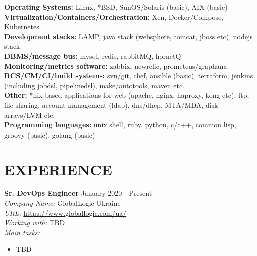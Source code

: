 \documentclass[mymargin,10pt]{res} %
\begin{document}
\begin{resume}
{\bf Operating Systems:} Linux, *BSD, SunOS/Solaris (basic), AIX (basic) \\
{\bf Virtualization/Containers/Orchestration:} Xen, Docker/Compose, Kubernetes \\
{\bf Development stacks:} LAMP, java stack (websphere, tomcat, jboss etc), nodejs stack \\
{\bf DBMS/message bus:} mysql, redis, rabbitMQ, hornetQ \\
{\bf Monitoring/metrics software:}  zabbix, newrelic, prometeus/graphana \\
{\bf RCS/CM/CI/build systems:} svn/git, chef, ansible (basic), terraform, jenkins (including jobdsl, pipelinedsl), make/autotools, maven etc. \\
{\bf Other:} *nix-based applications for web (apache, nginx, haproxy, kong etc), ftp, file sharing, account management (ldap), dns/dhcp, MTA/MDA, disk arrays/LVM etc. \\
{\bf Programming languages:} unix shell, ruby, python, c/c++, common lisp, groovy (basic), golang (basic) \\


\section{EXPERIENCE}

{\bf Sr. DevOps Engineer} \hfill January 2020 - Present \\
{\sl Company Name:} GlobalLogic Ukraine \\
{\sl URL:} \url{https://www.globallogic.com/ua/} \\
{\sl Working with:} TBD \\
{\sl Main tasks:}
\begin{itemize}
\item TBD
\end{itemize}


\end{resume}
\end{document}
